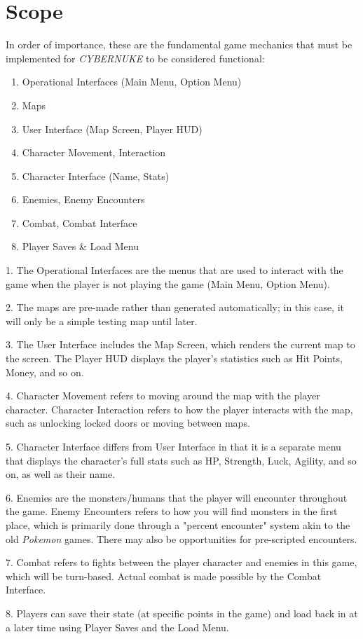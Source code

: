 \documentclass[10pt,conference,onecolumn,compsoc]{IEEEtran}
\begin{document}
\section{Scope}
In order of importance, these are the fundamental game mechanics that must be implemented for \emph{CYBERNUKE} to be considered functional:
\begin{enumerate}
\item Operational Interfaces (Main Menu, Option Menu)
\item Maps
\item User Interface (Map Screen, Player HUD)
\item Character Movement, Interaction
\item Character Interface (Name, Stats)
\item Enemies, Enemy Encounters
\item Combat, Combat Interface
\item Player Saves \& Load Menu\\
\end{enumerate} 

\begin{flushleft}
1. The Operational Interfaces are the menus that are used to interact with the game when the player is not playing the game (Main Menu, Option Menu).

2. The maps are pre-made rather than generated automatically; in this case, it will only be a simple testing map until later.

3. The User Interface includes the Map Screen, which renders the current map to the screen. The Player HUD displays the player's statistics such as Hit Points, Money, and so on.

4. Character Movement refers to moving around the map with the player character. Character Interaction refers to how the player interacts with the map, such as unlocking locked doors or moving between maps.

5. Character Interface differs from User Interface in that it is a separate menu that displays the character's full stats such as HP, Strength, Luck, Agility, and so on, as well as their name.

6. Enemies are the monsters/humans that the player will encounter throughout the game. Enemy Encounters refers to how you will find monsters in the first place, which is primarily done through a "percent encounter" system akin to the old \textit{Pokemon} games. There may also be opportunities for pre-scripted encounters.

7. Combat refers to fights between the player character and enemies in this game, which will be turn-based. Actual combat is made possible by the Combat Interface.

8. Players can save their state (at specific points in the game) and load back in at a later time using Player Saves and the Load Menu.
\end{flushleft}
\end{document}
